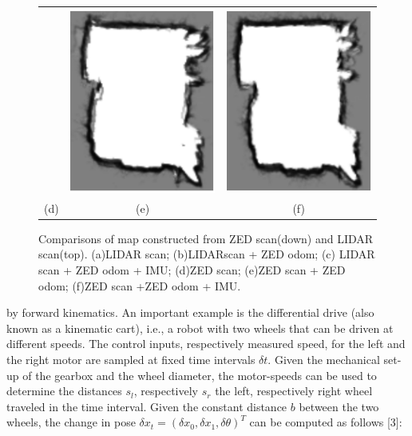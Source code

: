 \documentclass{article}
\begin{document}
\begin{figure}[H]
\begin{tabular}{ccc}
         &\includegraphics{image/e.PNG} 
         &\includegraphics{image/f.PNG} 
         \\ (d) & (e) & (f)
    \end{tabular}
    \caption{Comparisons of map constructed from ZED scan(down) and LIDAR scan(top).  (a)LIDAR scan; (b)LIDARscan + ZED odom; (c) LIDAR scan + ZED odom + IMU; (d)ZED scan; (e)ZED scan + ZED odom; (f)ZED scan +ZED odom + IMU.}
    \label{fig:fig3}
\end{figure}


by forward kinematics.  
An important example is the differential drive (also known as a kinematic cart), i.e., a robot with two wheels that can be driven at different speeds.  
The control inputs, respectively measured speed, for the left and the right motor are sampled at fixed time intervals $\delta t$.  
Given the mechanical set-up of the gearbox and the wheel diameter, the motor-speeds can be used to determine the distances $s_{l}$, respectively $s_{r}$ the left, respectively right wheel traveled in the time interval.  
Given the constant distance $b$ between the two wheels, the change in pose $\delta x_{t}= (\delta x_{0},\delta x_{1},\delta \theta)^{T}$ can be computed as follows [3]:
\end{document}
